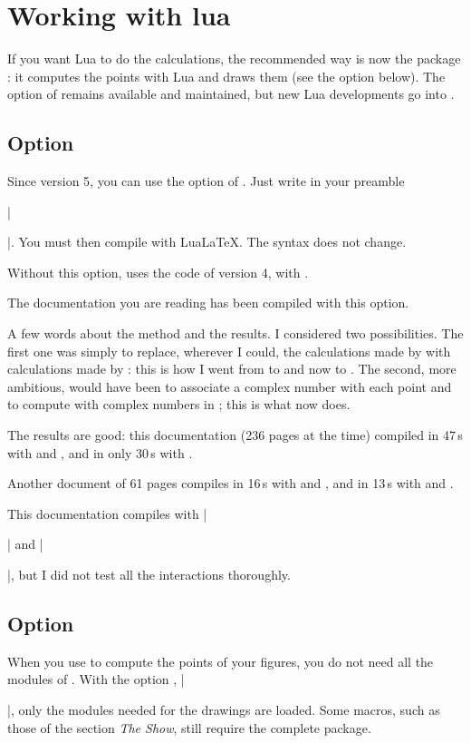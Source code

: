 \newpage
\section{Working with lua} \label{calc_with_lua}

If you want Lua to do the calculations, the recommended way is now the package : it computes the points with Lua and \tkzname{\tkznameofpack} draws them (see the option  below). The option  of \tkzname{\tkznameofpack} remains available and maintained, but new Lua developments go into .

\subsection{Option } %
\label{ssub:option_code_lua}

Since version 5, you can use the option  of \tkzname{\tkznameofpack}. Just write in your preamble

 |\usepackage[lua]{tkz-euclide}|.
 You must then compile with LuaLaTeX. The syntax does not change.

Without this option, \tkzname{\tkznameofpack} uses the code of version 4, with .

The documentation you are reading has been compiled with this option.

A few words about the method and the results. I considered two possibilities. The first one was simply to replace, wherever I could, the calculations made by  with calculations made by : this is how I went from  to  and now to . The second, more ambitious, would have been to associate a complex number with each point and to compute with complex numbers in ; this is what  now does.

The results are good: this documentation (236 pages at the time) compiled in 47\,s with  and , and in only 30\,s with .

Another document of 61 pages compiles in 16\,s with  and , and in 13\,s with  and .

This documentation compiles with |\usepackage{tkz-base}| and |\usepackage[lua]{tkz-euclide}|, but I did not test all the interactions thoroughly.

\subsection{Option } %
\label{ssub:option_code_mini}

When you use  to compute the points of your figures, you do not need all the modules of \tkzname{\tkznameofpack}. With the option , |\usepackage[mini]{tkz-euclide}|, only the modules needed for the drawings are loaded. Some macros, such as those of the section \emph{The Show}, still require the complete package.

\endinput